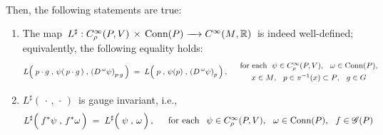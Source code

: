 \begin{theorem}
\begin{itemize}
\begin{equation*}
\begin{array}{c}
        \end{array}
    \end{equation*}
\end{itemize}
Then, the following statements are true:
\begin{enumerate}
\item
    The map
    \,$
    L^{\sharp} :
    C^{\infty}_{\rho}(P,V) \,\times\, \Conn(P)
    \xrightarrow{{\color{white}....}}
    C^{\infty}({\color{black}M},\Re)
    $\,
    is indeed well-defined;
    equivalently, the following equality holds:
    \begin{equation*}
    L\!\left(\;
        \overset{{\color{white}1}}{p \cdot g}
        \;,\,
        \psi(\,p\cdot g\,)
        \;,\,
        \left(D^{\,\omega}\psi\right)_{p \cdot g}
        \,\right)
    \; = \;
	    L\!\left(\;
	        \overset{{\color{white}1}}{p}
	        \;,\,
	        \psi(p)
	        \;,\,
	        \left(D^{\,\omega}\psi\right)_{p}
	        \,\right),
    \quad
    \begin{array}{c}
        \textnormal{for each \;$\psi \in C^{\infty}_{\rho}(P,V)$,\;\; $\omega \in \Conn(P)$},
        \\
        \overset{{\color{white}.}}{\textnormal{$x \in M$,\;\; $p \in \pi^{-1}(x) \subset P$,\;\; $g \in G$}}
        \end{array}
    \end{equation*}
\item
    $L^{\sharp}\!\left(\,\cdot\,,\,\cdot\,\right)$\, is gauge invariant, i.e.,
    \begin{equation*}
    L^{\sharp}\!\left(\;
        \overset{{\color{white}.}}{f^{*}\psi}
        \;,\,
        f^{*}\omega
        \,\right)
    \; = \;
	    L^{\sharp}\!\left(\;
	        \overset{{\color{white}.}}{\psi}
	        \;,\,
	        \omega
	        \,\right),
    \quad
    \begin{array}{c}
        \textnormal{for each\;\,
            $\psi \in C^{\infty}_{\rho}(P,V)$,
            \,
            $\omega \in \Conn(P)$,
            \,
            $f \in \mathscr{G}(P)$
            }
        \end{array}
    \end{equation*}
\end{enumerate}
\end{theorem}
\proof
